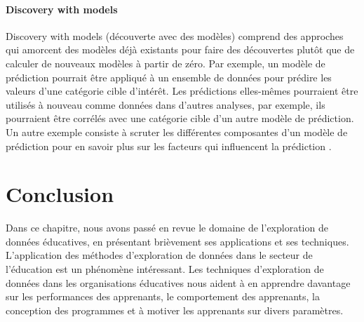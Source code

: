     \paragraph{Discovery with models}
    Discovery with models (découverte avec des modèles) comprend des approches qui amorcent des modèles déjà existants pour faire des découvertes plutôt que de calculer de nouveaux modèles à partir de zéro. Par exemple, un modèle de prédiction pourrait être appliqué à un ensemble de données pour prédire les valeurs d'une catégorie cible d'intérêt. Les prédictions elles-mêmes pourraient être utilisés à nouveau comme données dans d'autres analyses, par exemple, ils pourraient être corrélés avec une catégorie cible d’un autre modèle de prédiction. Un autre exemple consiste à scruter les différentes composantes d'un modèle de prédiction pour en savoir plus sur les facteurs qui influencent la prédiction \cite{Scheuer2012}.
    
    \section{Conclusion}
    Dans ce chapitre, nous avons passé en revue le domaine de l'exploration de données éducatives, en présentant brièvement ses applications et ses techniques. L'application des méthodes d'exploration de données dans le secteur de l'éducation est un phénomène intéressant. Les techniques d'exploration de données dans les organisations éducatives nous aident à en apprendre davantage sur les performances des apprenants, le comportement des apprenants, la conception des programmes et à motiver les apprenants sur divers paramètres.
	
	
